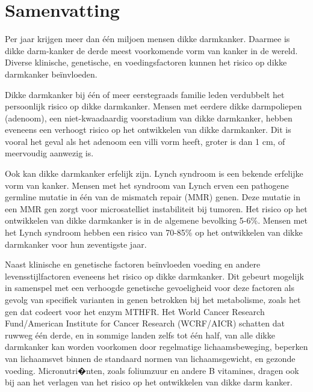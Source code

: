 \chapter*{Samenvatting}
\label{samenvatting}


\newpage

\noindent Per jaar krijgen meer dan \'e\'en miljoen mensen dikke darmkanker. Daarmee is dikke darm-kanker de derde meest voorkomende vorm van kanker in de wereld. Diverse klinische, genetische, en voedingsfactoren kunnen het risico op dikke darmkanker be\"invloeden.

\noindent Dikke darmkanker bij \'e\'en of meer eerstegraads familie leden verdubbelt het persoonlijk risico op dikke darmkanker. Mensen met eerdere dikke darmpoliepen (adenoom), een niet-kwaadaardig voorstadium van dikke darmkanker, hebben eveneens een verhoogt risico op het ontwikkelen van dikke darmkanker. Dit is vooral het geval als het adenoom een villi vorm heeft, groter is dan 1 cm, of meervoudig aanwezig is.

\noindent Ook kan dikke darmkanker erfelijk zijn. Lynch syndroom is een bekende erfelijke vorm van kanker. Mensen met het syndroom van Lynch erven een pathogene germline mutatie in \'e\'en van de mismatch repair (MMR) genen. Deze mutatie in een MMR gen zorgt voor microsatelliet instabiliteit bij tumoren. Het risico op het ontwikkelen van dikke darmkanker is in de algemene bevolking 5-6\%. Mensen met het Lynch syndroom hebben een risico van 70-85\% op het ontwikkelen van dikke darmkanker voor hun zeventigste jaar.

\noindent Naast klinische en genetische factoren be\"invloeden voeding en andere levensstijlfactoren eveneens het risico op dikke darmkanker. Dit gebeurt mogelijk in samenspel met een verhoogde genetische gevoeligheid voor deze factoren als gevolg van specifiek varianten in genen betrokken bij het metabolisme, zoals het gen dat codeert voor het enzym MTHFR. Het World Cancer Research Fund/American Institute for Cancer Research (WCRF/AICR) schatten dat ruwweg \'e\'en derde, en in sommige landen zelfs tot \'e\'en half, van alle dikke darmkanker kan worden voorkomen door regelmatige lichaamsbeweging, beperken van lichaamsvet binnen de standaard normen van lichaamsgewicht, en gezonde voeding. Micronutri�nten, zoals foliumzuur en andere B vitamines, dragen ook bij aan het verlagen van het risico op het ontwikkelen van dikke darm kanker.

